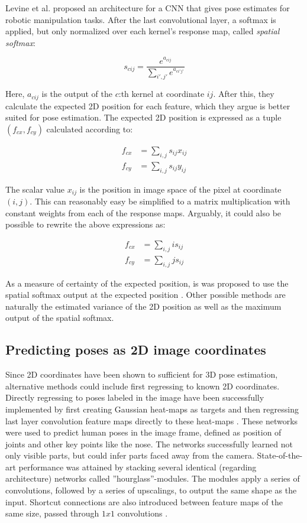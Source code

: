 Levine et al. \cite{levine2016end} proposed an architecture for a CNN that
gives pose estimates for robotic manipulation tasks. After the last
convolutional layer, a softmax is applied, but only normalized over each
kernel's response map, called \textit{spatial softmax}:

\begin{equation}
    s_{cij} = \frac{e^{a_{cij}}}{\sum_{i',j'} e^{a_{ci'j'}}}
\end{equation}

Here, $a_{cij}$ is the output of the $c$:th kernel at coordinate $ij$. After
this, they calculate the expected 2D position for each feature, which they
argue is better suited for pose estimation. The expected 2D position is
expressed as a tuple $(f_{cx}, f_{cy})$ calculated according to:

\begin{align}
    f_{cx} &= \sum_{i,j} s_{ij} x_{ij} \\
    f_{cy} &= \sum_{i,j} s_{ij} y_{ij}
\end{align}

The scalar value $x_{ij}$ is the position in image space of the pixel at coordinate
$(i, j)$. This can reasonably easy be simplified to a matrix multiplication with constant
weights from each of the response maps. Arguably, it could also be possible to rewrite the
above expressions as:

\begin{align}
    f_{cx} &= \sum_{i,j} i s_{ij} \\
    f_{cy} &= \sum_{i,j} j s_{ij}
\end{align}

As a measure of certainty of the expected position, is was proposed to use the
spatial softmax output at the expected position \cite{finn2016deep2}. Other
possible methods are naturally the estimated variance of the 2D position as
well as the maximum output of the spatial softmax.

\subsection{Predicting poses as 2D image coordinates}

Since 2D coordinates have been shown to sufficient for 3D pose estimation,
alternative methods could include first regressing to known 2D coordinates.
Directly regressing to poses labeled in the image have been successfully
implemented by first creating Gaussian heat-maps as targets and then regressing
last layer convolution feature maps directly to these heat-maps
\cite{newell2016stacked,tompson2014joint}. These networks were used to predict
human poses in the image frame, defined as position of joints and other key
points like the nose. The networks successfully learned not only visible parts,
but could infer parts faced away from the camera. State-of-the-art performance
was attained by stacking several identical (regarding architecture) networks
called ''hourglass''-modules. The modules apply a series of convolutions,
followed by a series of upscalings, to output the same shape as the input.
Shortcut connections are also introduced between feature maps of the same size,
passed through $1x1$ convolutions \cite{newell2016stacked}.

